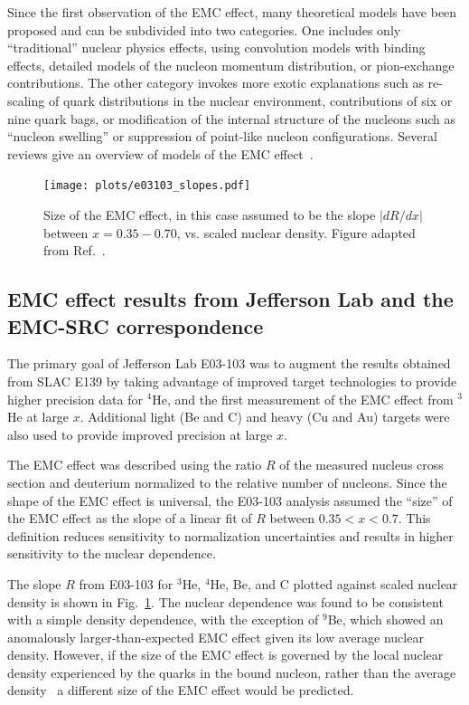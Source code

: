 Since the first observation of the EMC effect, many theoretical models have been proposed and can be subdivided into two categories.  One includes only ``traditional'' nuclear physics effects, using convolution models with binding effects, detailed models of the nucleon momentum distribution, or pion-exchange contributions. The other category invokes more exotic explanations such as re-scaling of quark distributions in the nuclear environment, contributions of six or nine
quark bags, or modification of the internal structure of the nucleons such as ``nucleon swelling'' or suppression of point-like nucleon configurations. Several reviews give an overview of models of the EMC effect~\cite{Geesaman:1995yd, Norton:2003cb, Piller:1999wx, Hen:2013oha, Malace:2014uea}.


\begin{figure}[tbp]
  \centering\texttt{[image: plots/e03103\_slopes.pdf]}
  \caption{Size of the EMC effect, in this case assumed to be the slope $|dR/dx|$ between $x=0.35-0.70$, vs. scaled nuclear
    density. Figure adapted from Ref.~\cite{Seely:2009gt}.}
  \label{fig:emc_jlab_hallc}
\end{figure}

\subsection{EMC effect results from Jefferson Lab and the EMC-SRC correspondence}

The primary goal of Jefferson Lab E03-103 was to augment the results obtained from SLAC E139 by taking
advantage of improved target technologies to provide higher precision data for $^4$He, and the first
measurement of the EMC effect from $^3$He at large $x$.  Additional light (Be and C) and heavy (Cu and Au)
targets were also used to provide improved precision at large $x$.

The EMC effect was described using the ratio $R$ of the measured nucleus cross section and deuterium
normalized to the relative number of nucleons.
Since the shape of the EMC effect is universal, the E03-103 analysis assumed the ``size'' of the EMC
effect as the slope of a linear fit of $R$ between $0.35<x<0.7$.  This definition reduces sensitivity to
normalization uncertainties and results in higher sensitivity to the nuclear dependence.

The slope $R$ from E03-103 for $^3$He, $^4$He, Be, and C plotted against scaled nuclear
density is shown in Fig.~\ref{fig:emc_jlab_hallc}.  The nuclear dependence was found to be consistent
with a simple density dependence, with the exception of $^9$Be,  which showed an anomalously larger-than-expected 
EMC effect given its low average nuclear density.  However, if the size of the EMC effect is
governed by the local nuclear density experienced by the quarks in the bound nucleon, rather than the
average density~\cite{Seely:2009gt, PhysRevC.82.054614} a different size of the EMC effect would be predicted.

